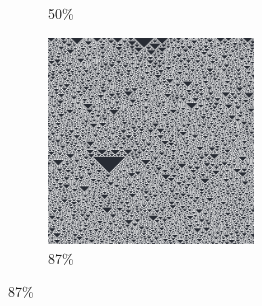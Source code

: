 \documentclass[12pt, fleqn]{report}                             %
\theoremstyle{break}                                            %
\begin{document}
\begin{figure}[ht!]
\begin{subfigure}[b]{0.4\linewidth}
          \caption{50\%}
        \end{subfigure}
        \begin{subfigure}[b]{0.4\linewidth}
          \includegraphics[width=0.6\textwidth]{Images/126/d.png}
          \caption{87\%}
        \end{subfigure}
      \end{figure}
\end{document}
